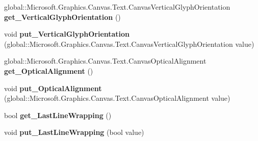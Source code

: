\begin{DoxyCompactItemize}
\item 
\mbox{\label{class_microsoft_1_1_graphics_1_1_canvas_1_1_text_1_1_canvas_text_format_ac501273bff089574992daf9dd1c47eb8}} 
global\+::\+Microsoft.\+Graphics.\+Canvas.\+Text.\+Canvas\+Vertical\+Glyph\+Orientation {\bfseries get\+\_\+\+Vertical\+Glyph\+Orientation} ()
\item 
\mbox{\label{class_microsoft_1_1_graphics_1_1_canvas_1_1_text_1_1_canvas_text_format_a78bb0a96f5140c39fdae9d2808bd58a0}} 
void {\bfseries put\+\_\+\+Vertical\+Glyph\+Orientation} (global\+::\+Microsoft.\+Graphics.\+Canvas.\+Text.\+Canvas\+Vertical\+Glyph\+Orientation value)
\item 
\mbox{\label{class_microsoft_1_1_graphics_1_1_canvas_1_1_text_1_1_canvas_text_format_a531fd44472e54817a9c459cce652d68f}} 
global\+::\+Microsoft.\+Graphics.\+Canvas.\+Text.\+Canvas\+Optical\+Alignment {\bfseries get\+\_\+\+Optical\+Alignment} ()
\item 
\mbox{\label{class_microsoft_1_1_graphics_1_1_canvas_1_1_text_1_1_canvas_text_format_a425c22e2e7141efc0555fd442659f0b7}} 
void {\bfseries put\+\_\+\+Optical\+Alignment} (global\+::\+Microsoft.\+Graphics.\+Canvas.\+Text.\+Canvas\+Optical\+Alignment value)
\item 
\mbox{\label{class_microsoft_1_1_graphics_1_1_canvas_1_1_text_1_1_canvas_text_format_aa855b7b2956b2494052e9cdd55b02fb4}} 
bool {\bfseries get\+\_\+\+Last\+Line\+Wrapping} ()
\item 
\mbox{\label{class_microsoft_1_1_graphics_1_1_canvas_1_1_text_1_1_canvas_text_format_a3a6a2fc656c46147b1092b31a50db0c1}} 
void {\bfseries put\+\_\+\+Last\+Line\+Wrapping} (bool value)
\item 
\mbox{\label{class_microsoft_1_1_graphics_1_1_canvas_1_1_text_1_1_canvas_text_format_a27e6bacad5baec82340ced77aff91b82}} 

\end{DoxyCompactItemize}

